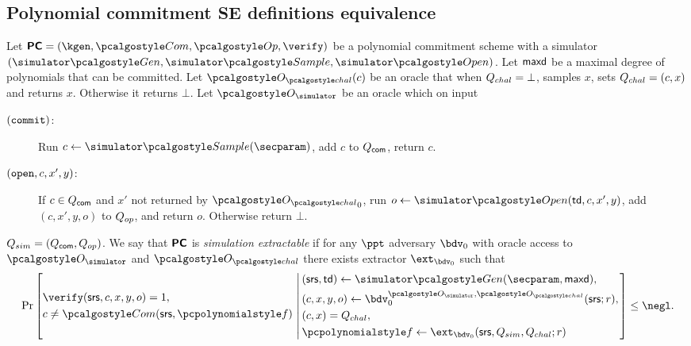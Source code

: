 \documentclass[runningheads,11pt]{llncs}
\begin{document}
\iffalse
\subsection{Polynomial commitment SE definitions equivalence}

\begin{definition}
  \label{def:se_bdv0}
  Let $\PCOM = (\kgen, \com, \op, \verify)$ be a polynomial commitment scheme with a
  simulator $(\simgen, \simsample, \simopen)$. Let $\mathsf{maxd}$ be a maximal degree of
  polynomials that can be committed. Let $\oraclec (c)$ be an oracle that when
  ${Q_{chal}} = \bot$, samples $x$, sets ${Q_{chal}} = (c, x)$  and
    returns $x$. Otherwise it returns $\bot$. Let $\oracles$ be an oracle which on
    input
     \begin{description}
     \item[$(\mathtt{commit})$:] Run $c \gets \simsample (\secparam)$, add $c$ to
       $Q_{\mathsf{com}}$, return $c$.
     \item[$(\mathtt{open}, c, x', y)$:] If $c \in Q_{\mathsf{com}}$ and $x'$ not returned by $\oraclec_0$, run
       $o \gets \simopen(\td, c, x', y)$, add $(c, x', y, o)$ to $Q_{op}$, and return
       $o$. Otherwise return $\bot$.
     \end{description}
     $Q_{sim} = (Q_{\mathsf{com}}, Q_{op})$.  We say that $\bm{\mathsf{PC}}$ is \emph{simulation
       extractable} if for any $\ppt$ adversary $\bdv_0$ with oracle access to
     $\oracles$ and $\oraclec$ there exists extractor $\ext_{\bdv_0}$ such that
     \[
       \Pr \left[
         \begin{aligned}
           & \verify(\srs, c, x, y, o) = 1, \\
           & c \neq \com(\srs, \p{f})\\
         \end{aligned}
         \,\left|\, \vphantom{
             \begin{aligned}
               & \\
               & \\
               & \\
               &
             \end{aligned}
           }
           \begin{aligned}
             & (\srs, \td) \gets \simgen(\secparam, \maxdeg),\\
             & (c, x, y, o) \gets \bdv_0^{\oracles,\oraclec}(\srs; r), \\
             & (c, x) = \Qchal, \\
             & \p{f} \gets \ext_{\bdv_0}(\srs, Q_{sim}, Q_{chal}; r)
           \end{aligned}
         \right.\right] \leq \negl.
     \]
\end{definition}
\end{document}
